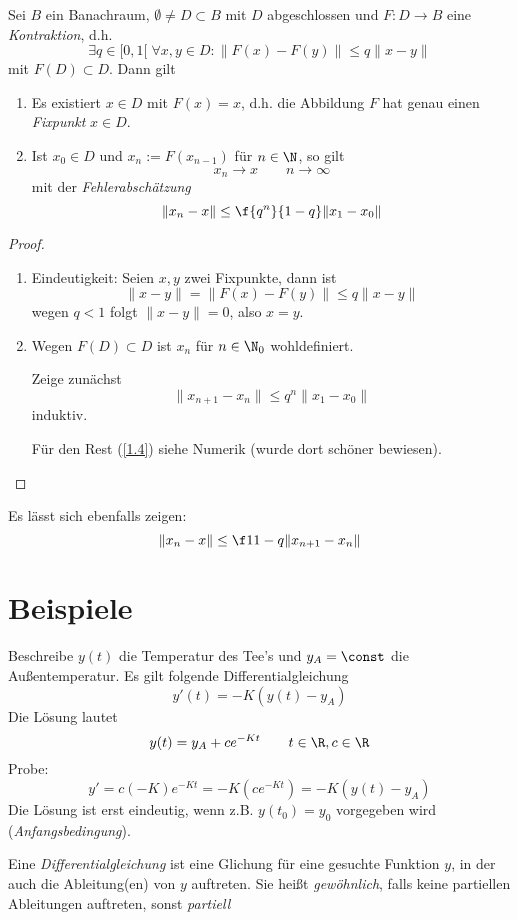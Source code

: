 \begin{st} \label{1.3}
	Sei $B$ ein Banachraum, $\emptyset \neq D \subset B$ mit $D$ abgeschlossen und $F: D \to B$ eine \emph{Kontraktion}, d.h.
	\[
		\exists q \in [0,1[ \; \forall x,y \in D : \|F(x) - F(y)\| \le q\|x-y\|
	\]
	mit $F(D) \subset D$. Dann gilt
	\begin{enumerate}[1)]
		\item
			Es existiert $x\in D$ mit $F(x)=x$, d.h. die Abbildung $F$ hat genau einen \emph{Fixpunkt} $x\in D$.
		\item
			Ist $x_0 \in D$ und $x_n := F(x_{n-1})$ für $n\in \N$, so gilt
			\[
				x_n \to x \qquad n \to \infty
			\]
			mit der \emph{Fehlerabschätzung}
			\[
				\|x_n - x\| \le \f{q^n}{1-q} \|x_1 - x_0\|
			\]
	\end{enumerate}
	\begin{proof}
		\begin{enumerate}[1)]
			\item
				Eindeutigkeit: Seien $x,y$ zwei Fixpunkte, dann ist
				\[
					\|x-y\| = \|F(x) - F(y)\| \le q \|x-y\|
				\]
				wegen $q < 1$ folgt $\|x-y\| = 0$, also $x=y$.
			\item
				Wegen $F(D) \subset D$ ist $x_n$ für $n\in \N_0$ wohldefiniert.

				Zeige zunächst
				\[
					\|x_{n+1} - x_n\| \le q^n \|x_1 - x_0\|
				\]
				induktiv.

				Für den Rest (\ref{1.4}) siehe Numerik (wurde dort schöner bewiesen).
		\end{enumerate}
	\end{proof}
\end{st}

\begin{nt} \label{1.4}
	Es lässt sich ebenfalls zeigen:
	\[
		\|x_n - x\| \le \f 1{1-q} \|x_{n+1} -x_n \|
	\]
\end{nt}

\setcounter{section}{0}
\section{Beispiele} %

\begin{ex}[Tee] \label{2.1}
	Beschreibe $y(t)$ die Temperatur des Tee's und $y_A = \const$ die Außentemperatur.
	Es gilt folgende Differentialgleichung
	\[
		y'(t) = -K( y(t) - y_A)
	\]
	Die Lösung lautet
	\[
		y(t) = y_A + c e^{-Kt} \qquad t\in \R, c\in \R
	\]
	Probe:
	\[
		y' = c(-K)e^{-Kt} = -K(ce^{-Kt}) = -K(y(t) - y_A)
	\]
	Die Lösung ist erst eindeutig, wenn z.B. $y(t_0) = y_0$ vorgegeben wird (\emph{Anfangsbedingung}).
\end{ex}

\begin{df} \label{2.1}
	Eine \emph{Differentialgleichung} ist eine Glichung für eine gesuchte Funktion $y$, in der auch die Ableitung(en) von $y$ auftreten.
	Sie heißt \emph{gewöhnlich}, falls keine partiellen Ableitungen auftreten, sonst \emph{partiell}
\end{df}
